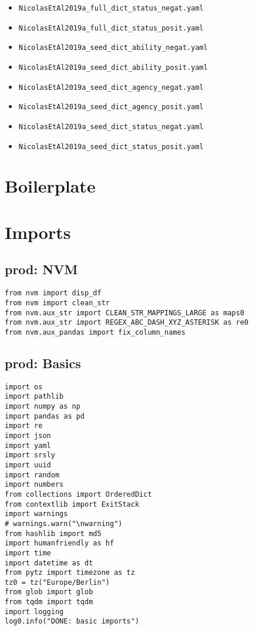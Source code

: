 \documentclass[a4paper,10pt,onecolumn,oneside,openright]{article}
\begin{document}
\begin{itemize}
\begin{itemize}
\item \texttt{NicolasEtAl2019a\_full\_dict\_status\_negat.yaml}
\item \texttt{NicolasEtAl2019a\_full\_dict\_status\_posit.yaml}
\item \texttt{NicolasEtAl2019a\_seed\_dict\_ability\_negat.yaml}
\item \texttt{NicolasEtAl2019a\_seed\_dict\_ability\_posit.yaml}
\item \texttt{NicolasEtAl2019a\_seed\_dict\_agency\_negat.yaml}
\item \texttt{NicolasEtAl2019a\_seed\_dict\_agency\_posit.yaml}
\item \texttt{NicolasEtAl2019a\_seed\_dict\_status\_negat.yaml}
\item \texttt{NicolasEtAl2019a\_seed\_dict\_status\_posit.yaml}
\end{itemize}
\end{itemize}

\section{Boilerplate}
\label{sec:orga287f3c}
\section{Imports}
\label{sec:org0061c47}
\subsection{prod: NVM}
\label{sec:orgdc3846c}
\begin{verbatim}
from nvm import disp_df
from nvm import clean_str
from nvm.aux_str import CLEAN_STR_MAPPINGS_LARGE as maps0
from nvm.aux_str import REGEX_ABC_DASH_XYZ_ASTERISK as re0
from nvm.aux_pandas import fix_column_names
\end{verbatim}

\subsection{prod: Basics}
\label{sec:org77e8a82}
\begin{verbatim}
import os
import pathlib
import numpy as np
import pandas as pd
import re
import json
import yaml
import srsly
import uuid
import random
import numbers
from collections import OrderedDict
from contextlib import ExitStack
import warnings
# warnings.warn("\nwarning")
from hashlib import md5
import humanfriendly as hf
import time
import datetime as dt
from pytz import timezone as tz
tz0 = tz("Europe/Berlin")
from glob import glob
from tqdm import tqdm
import logging
log0.info("DONE: basic imports")
\end{verbatim}
\end{document}
